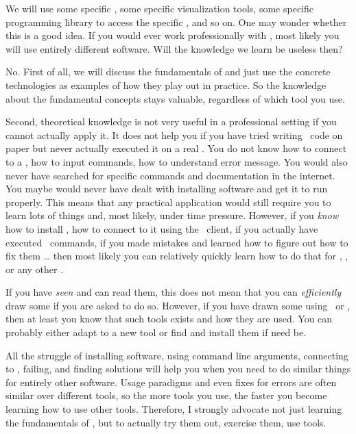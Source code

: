 %
%
%
We will use some specific \dbms, some specific visualization tools, some specific programming library to access the specific \dbms, and so on.
One may wonder whether this is a good idea.
If you would ever work professionally with , most likely you will use entirely different software.
Will the knowledge we learn be useless then?

No.
First of all, we will discuss the fundamentals of  and just use the concrete technologies as examples of how they play out in practice.
So the knowledge about the fundamental concepts stays valuable, regardless of which tool you use.

Second, theoretical knowledge is not very useful in a professional setting if you cannot actually apply it.
It does not help you if you have tried writing \sql\ code on paper but never actually executed it on a real \dbms.
You do not know how to connect to a \dbms, how to input commands, how to understand error message.
You would also never have searched for specific commands and documentation in the internet.
You maybe would never have dealt with installing software and get it to run properly.
This means that any practical application would still require you to learn lots of things and, most likely, under time pressure.
However, if you \emph{know} how to install \postgresql, how to connect to it using the \psql\ client, if you actually have executed \sql\ commands, if you made mistakes and learned how to figure out how to fix them {\dots} then most likely you can relatively quickly learn how to do that for \mysql, \mariadb, or any other \dbms.

If you have \emph{seen}  and can read them, this does not mean that you can \emph{efficiently} draw some if you are asked to do so.
However, if you have drawn some using \yEd\ or \pgmodeler, then at least you know that such tools exists and how they are used.
You can probably either adapt to a new tool or find and install them if need be.

All the struggle of installing software, using command line arguments, connecting  to , failing, and finding solutions will help you when you need to do similar things for entirely other software.
Usage paradigms and even fixes for errors are often similar over different tools, so the more tools you use, the faster you become learning how to use other tools.
Therefore, I strongly advocate not just learning the fundamentals of , but to actually try them out, exercise them, use tools.

